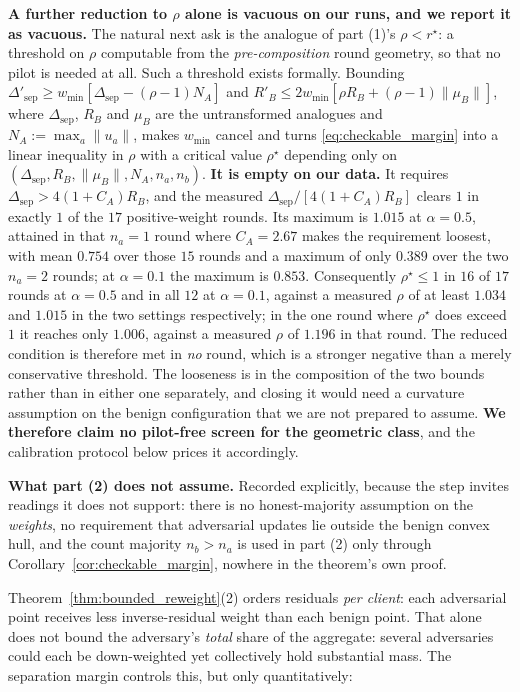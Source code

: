 \documentclass{article}
\begin{document}
\noindent\textbf{A further reduction to $\rho$ alone is vacuous on our runs, and we report it as vacuous.} The natural next ask is the analogue of part (1)'s $\rho < r^\star$: a threshold on $\rho$ computable from the \emph{pre-composition} round geometry, so that no pilot is needed at all. Such a threshold exists formally. Bounding $\Delta'_{\mathrm{sep}} \geq w_{\min}[\Delta_{\mathrm{sep}} - (\rho-1)N_A]$ and $R'_B \leq 2 w_{\min}[\rho R_B + (\rho-1)\|\mu_B\|]$, where $\Delta_{\mathrm{sep}}$, $R_B$ and $\mu_B$ are the untransformed analogues and $N_A := \max_a\|u_a\|$, makes $w_{\min}$ cancel and turns \eqref{eq:checkable_margin} into a linear inequality in $\rho$ with a critical value $\rho^\star$ depending only on $(\Delta_{\mathrm{sep}}, R_B, \|\mu_B\|, N_A, n_a, n_b)$. \textbf{It is empty on our data.} It requires $\Delta_{\mathrm{sep}} > 4(1{+}C_A)R_B$, and the measured $\Delta_{\mathrm{sep}}/[4(1{+}C_A)R_B]$ clears $1$ in exactly $1$ of the $17$ positive-weight rounds. Its maximum is $1.015$ at $\alpha{=}0.5$, attained in that $n_a{=}1$ round where $C_A = 2.67$ makes the requirement loosest, with mean $0.754$ over those $15$ rounds and a maximum of only $0.389$ over the two $n_a{=}2$ rounds; at $\alpha{=}0.1$ the maximum is $0.853$. Consequently $\rho^\star \leq 1$ in $16$ of $17$ rounds at $\alpha{=}0.5$ and in all $12$ at $\alpha{=}0.1$, against a measured $\rho$ of at least $1.034$ and $1.015$ in the two settings respectively; in the one round where $\rho^\star$ does exceed $1$ it reaches only $1.006$, against a measured $\rho$ of $1.196$ in that round. The reduced condition is therefore met in \emph{no} round, which is a stronger negative than a merely conservative threshold. The looseness is in the composition of the two bounds rather than in either one separately, and closing it would need a curvature assumption on the benign configuration that we are not prepared to assume. \textbf{We therefore claim no pilot-free screen for the geometric class}, and the calibration protocol below prices it accordingly.

\noindent\textbf{What part (2) does not assume.} Recorded explicitly, because the step invites readings it does not support: there is no honest-majority assumption on the \emph{weights}, no requirement that adversarial updates lie outside the benign convex hull, and the count majority $n_b > n_a$ is used in part (2) only through Corollary~\ref{cor:checkable_margin}, nowhere in the theorem's own proof.

Theorem~\ref{thm:bounded_reweight}(2) orders residuals \emph{per client}: each adversarial point receives less inverse-residual weight than each benign point. That alone does not bound the adversary's \emph{total} share of the aggregate: several adversaries could each be down-weighted yet collectively hold substantial mass. The separation margin controls this, but only quantitatively:
\end{document}
